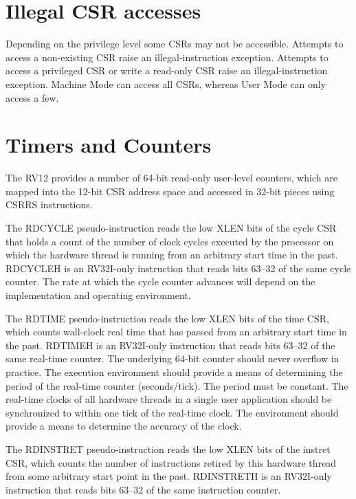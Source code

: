 \section{Illegal CSR accesses}\label{illegal-csr-accesses}

Depending on the privilege level some CSRs may not be accessible.
Attempts to access a non-existing CSR raise an illegal-instruction
exception. Attempts to access a privileged CSR or write a read-only CSR
raise an illegal-instruction exception. Machine Mode can access all
CSRs, whereas User Mode can only access a
few.

\section{Timers and Counters}\label{timers-and-counters}



The RV12 provides a number of 64-bit read-only user-level counters,
which are mapped into the 12-bit CSR address space and accessed in
32-bit pieces using CSRRS instructions.

The RDCYCLE pseudo-instruction reads the low XLEN bits of the cycle CSR
that holds a count of the number of clock cycles executed by the
processor on which the hardware thread is running from an arbitrary
start time in the past. RDCYCLEH is an RV32I-only instruction that reads
bits 63--32 of the same cycle counter. The rate at which the cycle
counter advances will depend on the implementation and operating
environment.

The RDTIME pseudo-instruction reads the low XLEN bits of the time CSR,
which counts wall-clock real time that has passed from an arbitrary
start time in the past. RDTIMEH is an RV32I-only instruction that reads
bits 63--32 of the same real-time counter. The underlying 64-bit counter
should never overflow in practice. The execution environment should
provide a means of determining the period of the real-time counter
(seconds/tick). The period must be constant. The real-time clocks of all
hardware threads in a single user application should be synchronized to
within one tick of the real-time clock. The environment should provide a
means to determine the accuracy of the clock.

The RDINSTRET pseudo-instruction reads the low XLEN bits of the instret
CSR, which counts the number of instructions retired by this hardware
thread from some arbitrary start point in the past. RDINSTRETH is an
RV32I-only instruction that reads bits 63--32 of the same instruction
counter.

